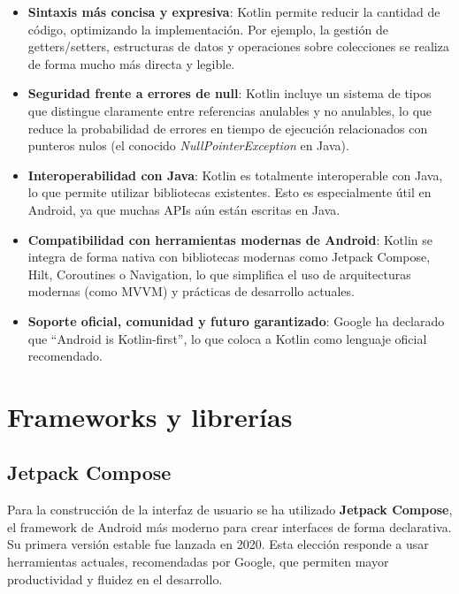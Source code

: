 \begin{itemize}
    \item \textbf{Sintaxis más concisa y expresiva}: Kotlin permite reducir la cantidad de código, optimizando la implementación. Por ejemplo, la gestión de getters/setters, estructuras de datos y operaciones sobre colecciones se realiza de forma mucho más directa y legible.

    \item \textbf{Seguridad frente a errores de null}: Kotlin incluye un sistema de tipos que distingue claramente entre referencias anulables y no anulables, lo que reduce la probabilidad de errores en tiempo de ejecución relacionados con punteros nulos (el conocido \textit{NullPointerException} en Java).

    \item \textbf{Interoperabilidad con Java}: Kotlin es totalmente interoperable con Java, lo que permite utilizar bibliotecas existentes. Esto es especialmente útil en Android, ya que muchas APIs aún están escritas en Java.

    \item \textbf{Compatibilidad con herramientas modernas de Android}: Kotlin se integra de forma nativa con bibliotecas modernas como Jetpack Compose, Hilt, Coroutines o Navigation, lo que simplifica el uso de arquitecturas modernas (como MVVM) y prácticas de desarrollo actuales.

    \item \textbf{Soporte oficial, comunidad y futuro garantizado}: Google ha declarado que “Android is Kotlin-first”, lo que coloca a Kotlin como lenguaje oficial recomendado.
\end{itemize}

\section{Frameworks y librerías}

\subsection{Jetpack Compose}

Para la construcción de la interfaz de usuario se ha utilizado \textbf{Jetpack Compose}, el framework de Android más moderno para crear interfaces de forma declarativa. Su primera versión estable fue lanzada en 2020. Esta elección responde a usar herramientas actuales, recomendadas por Google, que permiten mayor productividad y fluidez en el desarrollo.

